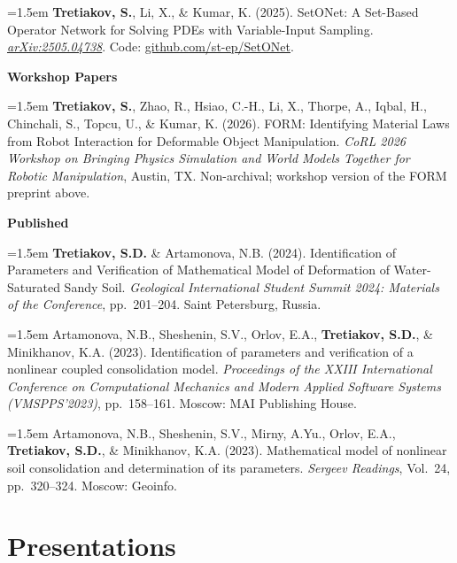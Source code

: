 \documentclass[11pt,letterpaper]{article}
\newcommand{\pubentry}[1]{%
    {\interlinepenalty=10000 \hangindent=1.5em\hangafter=1 #1\par}\vspace{2pt}
}
\begin{document}
\pubentry{\textbf{Tretiakov, S.}, Li, X., \& Kumar, K. (2025). SetONet: A Set-Based Operator Network for Solving PDEs with Variable-Input Sampling. \textit{\href{https://arxiv.org/abs/2505.04738}{arXiv:2505.04738}}. Code: \href{https://github.com/st-ep/SetONet}{github.com/st-ep/SetONet}.}

\vspace{2pt}
\textbf{Workshop Papers}
\vspace{4pt}

\pubentry{\textbf{Tretiakov, S.}, Zhao, R., Hsiao, C.-H., Li, X., Thorpe, A., Iqbal, H., Chinchali, S., Topcu, U., \& Kumar, K. (2026). FORM: Identifying Material Laws from Robot Interaction for Deformable Object Manipulation. \textit{CoRL 2026 Workshop on Bringing Physics Simulation and World Models Together for Robotic Manipulation}, Austin, TX. Non-archival; workshop version of the FORM preprint above.}

\vspace{2pt}
\textbf{Published}
\vspace{4pt}

\pubentry{\textbf{Tretiakov, S.D.} \& Artamonova, N.B. (2024). Identification of Parameters and Verification of Mathematical Model of Deformation of Water-Saturated Sandy Soil. \textit{Geological International Student Summit 2024: Materials of the Conference}, pp.\ 201--204. Saint Petersburg, Russia.}

\pubentry{Artamonova, N.B., Sheshenin, S.V., Orlov, E.A., \textbf{Tretiakov, S.D.}, \& Minikhanov, K.A. (2023). Identification of parameters and verification of a nonlinear coupled consolidation model. \textit{Proceedings of the XXIII International Conference on Computational Mechanics and Modern Applied Software Systems (VMSPPS'2023)}, pp.\ 158--161. Moscow: MAI Publishing House.}

\pubentry{Artamonova, N.B., Sheshenin, S.V., Mirny, A.Yu., Orlov, E.A., \textbf{Tretiakov, S.D.}, \& Minikhanov, K.A. (2023). Mathematical model of nonlinear soil consolidation and determination of its parameters. \textit{Sergeev Readings}, Vol.\ 24, pp.\ 320--324. Moscow: Geoinfo.}

\section{Presentations}
\end{document}
